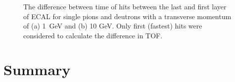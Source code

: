 \documentclass[final,1p,11pt]{elsarticle}
\begin{document}
\begin{figure}
\begin{center}
\end{center}
\caption{The difference between time of hits between the last and first layer of ECAL for single pions and deutrons with a transverse momentum of (a) 1~GeV  and (b) 10 GeV. 
Only first (fastest) hits were considered to calculate the difference in TOF. }
\label{fig:timediff}
\end{figure}



\clearpage 





%

%


\section{Summary}
\end{document}
